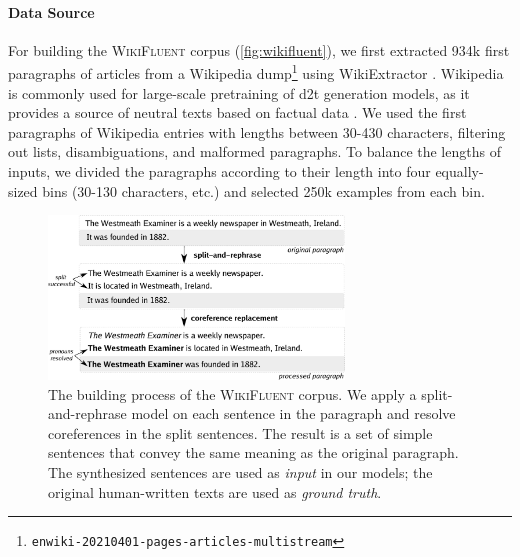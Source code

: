 \paragraph{Data Source} For building the \textsc{WikiFluent} corpus (\autoref{fig:wikifluent}), we first extracted 934k first paragraphs of articles from a Wikipedia dump\footnote{\texttt{enwiki-20210401-pages-articles-multistream}} using WikiExtractor \cite{Wikiextractor2015}. Wikipedia is commonly used for large-scale pretraining of \ac{d2t} generation models, as it provides a source of neutral texts based on factual data \cite{jinGenWikiDatasetMillion2020,chenKGPTKnowledgeGroundedPreTraining2020}.
We used the first paragraphs of Wikipedia entries with lengths between 30-430 characters, filtering out lists, disambiguations, and malformed paragraphs. To balance the lengths of inputs, we divided the paragraphs according to their length into four equally-sized bins (30-130 characters, etc.) and selected 250k examples from each bin.



\begin{figure}[t]
    \centering
    \includegraphics[width=0.7\textwidth]{img/wikifluent.pdf}
    \caption[Building the \textsc{WikiFluent} corpus.]{The building process of the \textsc{WikiFluent} corpus. We apply a split-and-rephrase model on each sentence in the paragraph and resolve coreferences in the split sentences. The result is a set of simple sentences that convey the same meaning as the original paragraph. The synthesized sentences are used as \textit{input} in our models; the original human-written texts are used as \textit{ground truth}.}\label{fig:wikifluent}
\end{figure}


